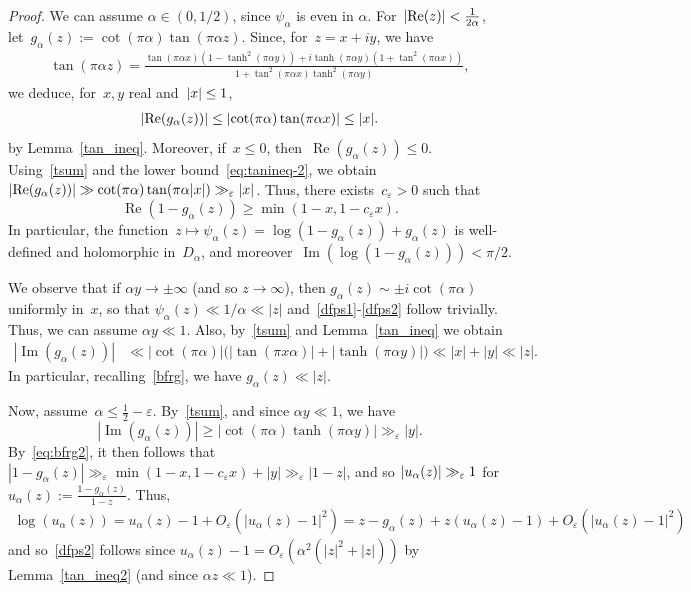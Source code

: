 \documentclass[11pt]{amsart}
\newcommand{\eps}{\varepsilon}
\theoremstyle{definition}
\renewcommand\Re{\operatorname{Re}}
\renewcommand\Im{\operatorname{Im}}
\newcommand{\1}{{\mathbf 1}}
\newcommand{\abs}[1]{\left|#1\right|}
\let\originalleft\left
\let\originalright\right
\renewcommand{\left}{\mathopen{}\mathclose\bgroup\originalleft}
\renewcommand{\right}{\aftergroup\egroup\originalright}
\numberwithin{equation}{section}
\begin{document}
\begin{proof}
We can assume $\alpha\in(0,1/2)$, since $\psi_\alpha$ is even in $\alpha$.
For~$\abs{\Re(z)}<\frac1{2\alpha}$, let~$g_\alpha(z) := \cot(\pi \alpha) \tan(\pi \alpha z)$. Since, for~$z=x+iy$, we have
  \begin{align}\label{tsum}
    \tan(\pi \alpha z)=\frac{\tan(\pi \alpha x)(1-\tanh^2 (\pi \alpha y))+i\tanh(\pi\alpha y)(1+\tan^2 (\pi\alpha  x))}{1+\tan^2(\pi\alpha  x)\tanh^2(\pi\alpha y)},
  \end{align}
  we deduce, for~$x, y$ real and~$\abs{x}\leq 1$,
  \begin{align}
    \abs{\Re(g_\alpha(z))} \leq \abs{\cot(\pi\alpha)\tan(\pi \alpha x)} \leq \abs{x}\label{bfrg}.
  \end{align}
  by Lemma~\ref{tan_ineq}. Moreover, if~$x\leq 0$, then~$\Re(g_\alpha(z))\leq 0$. Using~\eqref{tsum} and the lower bound~\eqref{eq:tanineq-2}, we obtain~$\abs{\Re(g_\alpha(z))} \gg \cot(\pi \alpha) \tan(\pi \alpha \abs{x}) \gg_\eps \abs{x}$. Thus, there exists~$c_\eps>0$ such that
  \begin{equation}
    \Re(1-g_\alpha(z)) \geq \min(1-x, 1-c_\eps x). \label{eq:bfrg2}
  \end{equation}
  In particular, the function~$z\mapsto \psi_\alpha(z) = \log(1-g_\alpha(z)) + g_\alpha(z)$ is well-defined and holomorphic in~$D_\alpha$, and moreover~$\Im(\log(1-g_\alpha(z))) < \pi / 2$. 
  
  We observe that if $\alpha y\to\pm \infty$ (and so $z\to\infty$), then $g_{\alpha}(z)\sim\pm i\cot(\pi\alpha)$ uniformly in~$x$, so that $\psi_\alpha (z)\ll 1/\alpha\ll |z|$ and~\eqref{dfps1}-\eqref{dfps2} follow trivially. Thus, we can assume $\alpha y\ll1$.
  Also, by~\eqref{tsum} and Lemma~\ref{tan_ineq} we obtain
  \begin{align}
    |\Im(g_\alpha(z))| &\ll |\cot(\pi\alpha)|\big(|\tan (\pi x\alpha)|+|\tanh (\pi \alpha y)|)\ll |x|+|y|\ll |z|.\label{bfig}
  \end{align}
  In particular, recalling~\eqref{bfrg}, we have $g_\alpha(z)\ll |z|$.
  
  Now, assume~$\alpha \leq \frac12 - \eps$. By~\eqref{tsum}, and since $\alpha y\ll1$, we have 
  $$|\Im(g_{\alpha}(z))|\geq |\cot(\pi\alpha)\tanh(\pi \alpha y)|\gg_\eps |y| . $$ 
  By~\eqref{eq:bfrg2}, it then follows that $|1-g_{\alpha}(z)|\gg_\eps \min(1-x, 1-c_\eps x)+|y|\gg_\eps |1-z|$, and so $\abs{u_\alpha(z)}\gg_\eps1$ for $u_\alpha(z):=\frac{1-g_\alpha(z)}{1-z}$. Thus,
  \begin{align*}
    \log(u_\alpha(z))=u_\alpha(z)-1+O_\eps(|u_\alpha(z)-1|^2)=z-g_\alpha(z)+z (u_\alpha(z)-1)+O_\eps(|u_\alpha(z)-1|^2)
  \end{align*}
  and so~\eqref{dfps2} follows since $u_\alpha(z)-1=O_\eps(\alpha^2(|z|^2+|z|))$ by Lemma~\ref{tan_ineq2} (and since $\alpha z\ll1$). 
  

\end{proof}
\end{document}
